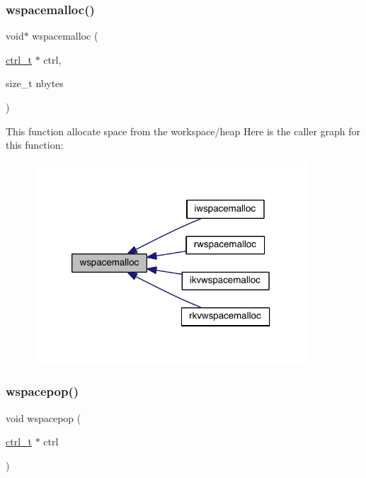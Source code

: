 \subsubsection{\texorpdfstring{wspacemalloc()}{wspacemalloc()}}
{\footnotesize\ttfamily void$\ast$ wspacemalloc (\begin{DoxyParamCaption}\item[{\hyperlink{a00742}{ctrl\+\_\+t} $\ast$}]{ctrl,  }\item[{size\+\_\+t}]{nbytes }\end{DoxyParamCaption})}

This function allocate space from the workspace/heap Here is the caller graph for this function\+:\nopagebreak
\begin{figure}[H]
\begin{center}
\leavevmode
\includegraphics[width=290pt]{a00981_a555f2ae3f4e5561c9b1ef592bf0f8476_icgraph}
\end{center}
\end{figure}
\mbox{\label{a00981_ad26c08175b8b18d7dfb86f2f8d91b09e}} 
\subsubsection{\texorpdfstring{wspacepop()}{wspacepop()}}
{\footnotesize\ttfamily void wspacepop (\begin{DoxyParamCaption}\item[{\hyperlink{a00742}{ctrl\+\_\+t} $\ast$}]{ctrl }\end{DoxyParamCaption})}

